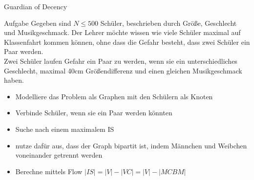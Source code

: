 \begin{frame}{Guardian of Decency}
	\vspace{-0.3cm}
	\begin{block}{Aufgabe}
		Gegeben sind $N\leq 500$ Schüler, beschrieben durch Größe, Geschlecht und Musikgeschmack. Der Lehrer möchte wissen wie viele Schüler maximal auf Klassenfahrt kommen können, ohne dass die Gefahr besteht, dass zwei Schüler ein Paar werden.\\\pause
		Zwei Schüler laufen Gefahr ein Paar zu werden, wenn sie ein unterschiedliches Geschlecht, maximal 40cm Größendifferenz und einen gleichen Musikgeschmack haben.
	\end{block}
	\pause
	\begin{itemize}
		\setlength\itemsep{0.05em}
		\item Modelliere das Problem als Graphen mit den Schülern als Knoten
		\item Verbinde Schüler, wenn sie ein Paar werden könnten
		\pause
		\item Suche nach einem maximalem IS
		\pause
		\item nutze dafür aus, dass der Graph bipartit ist, indem Männchen und Weibchen voneinander getrennt werden
		\item Berechne mittels Flow $|IS|=|V|-|VC|=|V|-|MCBM|$
	\end{itemize}
\end{frame}